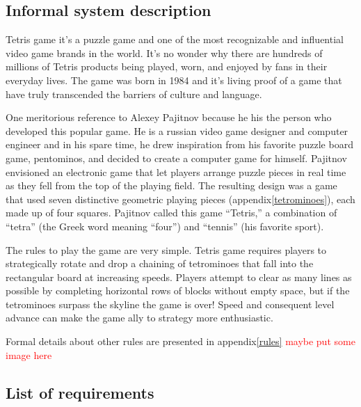 \documentclass[a4paper]{article}
\begin{document}
\subsection{Informal system description}

Tetris game it's a puzzle game and one of the most recognizable and influential video game brands in the world. It’s no wonder why there are hundreds of millions of Tetris products being played, worn, and enjoyed by fans in their everyday lives. The game was born in 1984 and it's living proof of a game that have truly transcended the barriers of culture and language.

One meritorious reference to Alexey Pajitnov because he his the person who developed this popular game. He is a russian video game designer and computer engineer and in his spare time, he drew inspiration from his favorite puzzle board game, pentominos, and decided to create a computer game for himself. Pajitnov envisioned an electronic game that let players arrange puzzle pieces in real time as they fell from the top of the playing field. The resulting design was a game that used seven distinctive geometric playing pieces (appendix\ref{tetrominoes}), each made up of four squares. Pajitnov called this game “Tetris,” a combination of “tetra” (the Greek word meaning “four”) and “tennis” (his favorite sport).

The rules to play the game are very simple. Tetris game requires players to strategically rotate and drop a chaining of tetrominoes that fall into the rectangular board at increasing speeds. Players attempt to clear as many lines as possible by completing horizontal rows of blocks without empty space, but if the tetrominoes surpass the skyline the game is over! Speed and consequent level advance can make the game ally to strategy more enthusiastic.

Formal details about other rules are presented in appendix\ref{rules}
\textcolor{red}{maybe put some image here}
\subsection{List of requirements}
\end{document}
